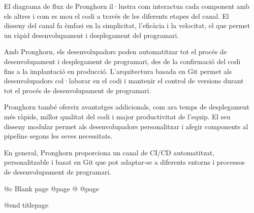 El diagrama de flux de Pronghorn il·lustra com interactua cada component amb els altres i com es mou el codi a través de les diferents etapes del canal. El disseny del canal fa èmfasi en la simplicitat, l'eficàcia i la velocitat, el que permet un ràpid desenvolupament i desplegament del programari.

Amb Pronghorn, els desenvolupadors poden automatitzar tot el procés de desenvolupament i desplegament de programari, des de la confirmació del codi fins a la implantació en producció. L'arquitectura basada en Git permet als desenvolupadors col·laborar en el codi i mantenir el control de versions durant tot el procés de desenvolupament de programari.

Pronghorn també ofereix avantatges addicionals, com ara temps de desplegament més ràpids, millor qualitat del codi i major productivitat de l'equip. El seu disseny modular permet als desenvolupadors personalitzar i afegir components al pipeline segons les seves necessitats.

En general, Pronghorn proporciona un canal de CI/CD automatitzat, personalitzable i basat en Git que pot adaptar-se a diferents entorns i processos de desenvolupament de programari.

@c Blank page
@page
@
@page

@end titlepage

